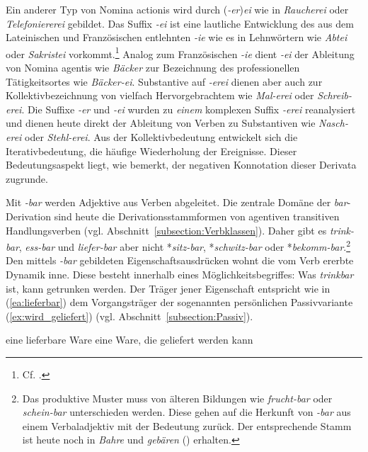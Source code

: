 Ein anderer Typ von Nomina actionis wird durch (\textit{-er})\textit{ei} wie in \textit{Raucherei} oder \textit{Telefoniererei} gebildet. Das Suffix \textit{-ei} ist eine lautliche Entwicklung des aus dem Lateinischen und Französischen entlehnten \textit{-ie} wie es in Lehnwörtern wie \textit{Abtei} oder \textit{Sakristei} vorkommt.\footnote{Cf. \citet[81--82]{Paul1920Wb}.} Analog zum Französischen \textit{-ie} dient \textit{-ei} der Ableitung von Nomina agentis wie \textit{Bäcker} zur Bezeichnung des professionellen Tätigkeitsortes wie \textit{Bäcker-ei}. Substantive auf \textit{-erei} dienen aber auch zur Kollektivbezeichnung von vielfach Hervorgebrachtem wie \textit{Mal-erei} oder \textit{Schreib-erei}. Die Suffixe \textit{-er} und \textit{-ei} wurden zu \textit{einem} komplexen Suffix \textit{-erei} reanalysiert und dienen heute direkt der Ableitung von Verben zu Substantiven wie \textit{Nasch-erei} oder \textit{Stehl-erei}. Aus der Kollektivbedeutung entwickelt sich die Iterativbedeutung, die häufige Wiederholung der Ereignisse. Dieser Bedeutungsaspekt liegt, wie \citet[352]{Olsen1991} bemerkt, der negativen Konnotation dieser Derivata zugrunde.


\label{subsubsection:bar}

Mit \textit{-bar} werden Adjektive aus Verben abgeleitet. Die zentrale Domäne der \textit{bar}-Derivation sind heute die Derivationsstammformen von agentiven transitiven Handlungsverben (vgl. Abschnitt~\ref{subsection:Verbklassen}). Daher gibt es \textit{trink-bar}, \textit{ess-bar} und \textit{liefer-bar} aber nicht *\textit{sitz-bar}, *\textit{schwitz-bar} oder *\textit{bekomm-bar}.\footnote{Das produktive Muster muss von älteren Bildungen wie \textit{frucht-bar} oder \textit{schein-bar} unterschieden werden. Diese gehen auf die Herkunft von \textit{-bar} aus einem Verbaladjektiv mit der Bedeutung  zurück. Der entsprechende Stamm ist heute noch in \textit{Bahre} und \textit{gebären} () erhalten.} Den mittels \textit{-bar} gebildeten Eigenschaftsausdrücken wohnt die vom Verb ererbte Dynamik inne. Diese besteht innerhalb eines Möglichkeitsbegriffes: Was \textit{trinkbar} ist, kann getrunken werden. Der Träger jener Eigenschaft entspricht wie in (\ref{ea:lieferbar}) dem Vorgangsträger der sogenannten persönlichen Passivvariante (\ref{ex:wird_geliefert}) (vgl. Abschnitt~\ref{subsection:Passiv}).

\ea \label{ea:Eigenschaft_Vorgangsträger}
\ea \label{ea:lieferbar} eine lieferbare Ware
\ex \label{ex:wird_geliefert} eine Ware, die geliefert werden kann
\z 
\z 

